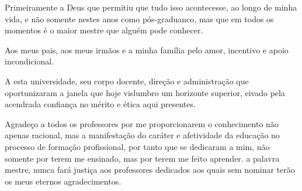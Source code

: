 Primeiramente a Deus que permitiu que tudo isso acontecesse, ao longo de minha vida, e não somente nestes anos como pós-graduanco, mas que em todos os momentos é o maior mestre que alguém pode conhecer.
	
Aos meus pais, aos meus irmãos e a minha família pelo amor, incentivo e apoio incondicional.

A esta universidade, seu corpo docente, direção e administração que oportunizaram a janela que hoje vislumbro um horizonte superior, eivado pela acendrada confiança no mérito e ética aqui presentes.

Agradeço a todos os professores por me proporcionarem o conhecimento não apenas racional, mas a manifestação do caráter e afetividade da educação no processo de formação profissional, por tanto que se dedicaram a mim, não somente por terem me ensinado, mas por terem me feito aprender. a palavra mestre, nunca fará justiça aos professores dedicados aos quais sem nominar terão os meus eternos agradecimentos.